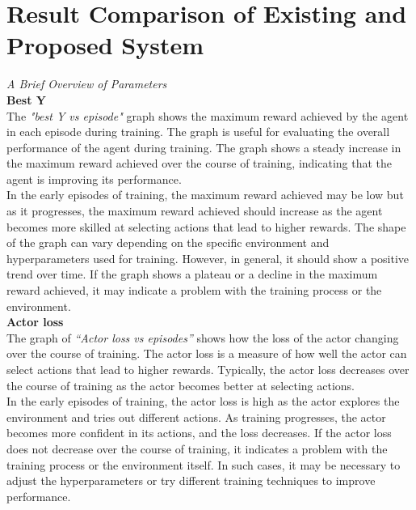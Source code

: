 \documentclass[conference]{IEEEtran}
\begin{document}
\section{Result Comparison of Existing and Proposed System}
\textit{A Brief Overview of Parameters}\\


\textbf{Best Y}\\

The \textit{"best Y vs episode" }graph shows the maximum reward achieved by the agent in each episode during training. The graph is useful for evaluating the overall performance of the agent during training. The graph shows a steady increase in the maximum reward achieved over the course of training, indicating that the agent is improving its performance.\\

In the early episodes of training, the maximum reward achieved may be low but as it progresses, the maximum reward achieved should increase as the agent becomes more skilled at selecting actions that lead to higher rewards.
The shape of the graph can vary depending on the specific environment and hyperparameters used for training. However, in general, it should show a positive trend over time. If the graph shows a plateau or a decline in the maximum reward achieved, it may indicate a problem with the training process or the environment. \\




\textbf{Actor loss}\\

The graph of \textit{“Actor loss vs episodes” } shows how the loss of the actor changing over the course of training. The actor loss is a measure of how well the actor can select actions that lead to higher rewards. Typically, the actor loss decreases over the course of training as the actor becomes better at selecting actions.\\

In the early episodes of training, the actor loss is high as the actor explores the environment and tries out different actions. As training progresses, the actor becomes more confident in its actions, and the loss decreases. If the actor loss does not decrease over the course of training, it indicates a problem with the training process or the environment itself. In such cases, it may be necessary to adjust the hyperparameters or try different training techniques to improve performance.\\
\end{document}
